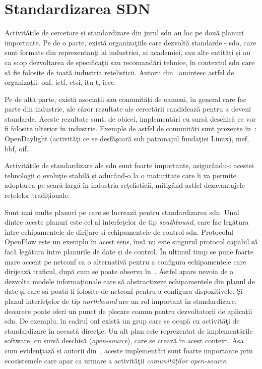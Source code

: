 \section{Standardizarea SDN}

Activitățile de cercetare și standardizare din jurul \gls{sdn} au loc pe două planuri importante. Pe de o parte, există organizaţiile care dezvoltă standarde - \gls{sdo}, care sunt formate din reprezentanţi ai industriei, ai academiei, sau alte entități și au ca scop dezvoltarea de specificaţii sau recomandări tehnice, în contextul \gls{sdn} care să fie folosite de toată industria rețelisticii. Autorii din~\cite{schneider2014standardizations} amintesc astfel de organizații: \gls{onf}, \gls{ietf}, \gls{etsi}, \gls{itu-t}, \gls{ieee}. 

Pe de altă parte, există asociații sau comunități de oameni, în general care fac parte din industrie, ale căror rezultate ale cercetării candidează pentru a deveni standarde. Aceste rezultate sunt, de obicei, implementări cu sursă deschisă ce vor fi folosite ulterior în industrie. Exemple de astfel de comunități sunt prezente în~\cite{halpern2014standards, meyer2013software}: OpenDaylight (activităţi ce se desfăşoară sub patronajul fundaţiei Linux), \gls{mef}, \gls{bbf}, \gls{oif}.

Activitățile de standardizare ale \gls{sdn} sunt foarte importante, asigurându-i acestei tehnologii o evoluţie stabilă și aducând-o la o maturitate care îi va permite adoptarea pe scară largă în industria rețelisticii, mitigând astfel dezavantajele rețelelor tradiționale.

Sunt mai multe planuri pe care se lucrează pentru standardizarea \gls{sdn}. Unul dintre aceste planuri este cel al interfeţelor de tip \textit{southbound}, care fac legătura între echipamentele de dirijare și echipamentele de control \gls{sdn}. Protocolul OpenFlow este un exemplu în acest sens, însă nu este singurul protocol capabil să facă legătura între planurile de date și de control. În ultimul timp se pune foarte mare accent pe \gls{netconf} ca o alternativă pentru a configura echipamentele care dirijează traficul, după cum se poate observa în~\cite{csoma2015escape, felix2014multi, zhou2014research}. Astfel apare nevoia de a dezvolta modele informaţionale care să abstractizeze echipamentele din planul de date și care să poată fi folosite de \gls{netconf} pentru a configura dispozitivele. Și planul interfeţelor de tip \textit{northbound} are un rol important în standardizare, deoarece poate oferi un punct de plecare comun pentru dezvoltatorii de aplicații \gls{sdn}. De exemplu, în cadrul \gls{onf} există un grup care se ocupă cu activităţi de standardizare în această direcţie. Un alt plan este reprezentat de implementările software, cu sursă deschisă (\textit{open-source}), care se crează în acest context. Așa cum evidenţiază și autorii din~\cite{lin2014software, rothenberg2014open}, aceste implementări sunt foarte importante prin ecosistemele care apar ca urmare a activităţii \textit{comunităţilor open-source}.

